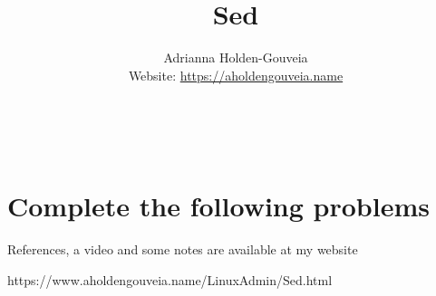 \documentclass[12pt]{article}
\title{Sed}
\author{
        Adrianna Holden-Gouveia \\
        Website: \url{https://aholdengouveia.name}\\ 
        \date{\vspace{-5ex}}
        \faLinkedin{: aholdengouveia} \\
        \faGithub {: aholdengouveia} \\
        }
\begin{document}
    

\maketitle


\section*{Complete the following problems}

References, a video and some notes are available at my website

https://www.aholdengouveia.name/LinuxAdmin/Sed.html
\end{document}
